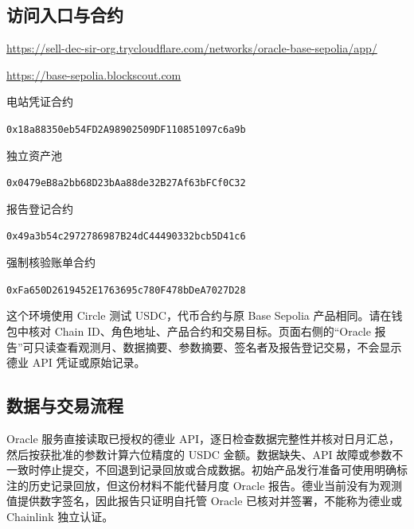 \documentclass[12pt,a4paper]{article}
\begin{document}
\subsection{访问入口与合约}
\url{https://sell-dec-sir-org.trycloudflare.com/networks/oracle-base-sepolia/app/}\par
\url{https://base-sepolia.blockscout.com}\par
电站凭证合约\par\nolinkurl{0x18a88350eb54FD2A98902509DF110851097c6a9b}\par\smallskip
独立资产池\par\nolinkurl{0x0479eB8a2bb68D23bAa88de32B27Af63bFCf0C32}\par\smallskip
报告登记合约\par\nolinkurl{0x49a3b54c2972786987B24dC44490332bcb5D41c6}\par\smallskip
强制核验账单合约\par\nolinkurl{0xFa650D2619452E1763695c780F478bDeA7027D28}\par\smallskip
这个环境使用 Circle 测试 USDC，代币合约与原 Base Sepolia 产品相同。请在钱包中核对 Chain ID、角色地址、产品合约和交易目标。页面右侧的“Oracle 报告”可只读查看观测月、数据摘要、参数摘要、签名者及报告登记交易，不会显示德业 API 凭证或原始记录。

\subsection{数据与交易流程}
\begin{center}\end{center}
Oracle 服务直接读取已授权的德业 API，逐日检查数据完整性并核对日月汇总，然后按获批准的参数计算六位精度的 USDC 金额。数据缺失、API 故障或参数不一致时停止提交，不回退到记录回放或合成数据。初始产品发行准备可使用明确标注的历史记录回放，但这份材料不能代替月度 Oracle 报告。德业当前没有为观测值提供数字签名，因此报告只证明自托管 Oracle 已核对并签署，不能称为德业或 Chainlink 独立认证。
\end{document}
